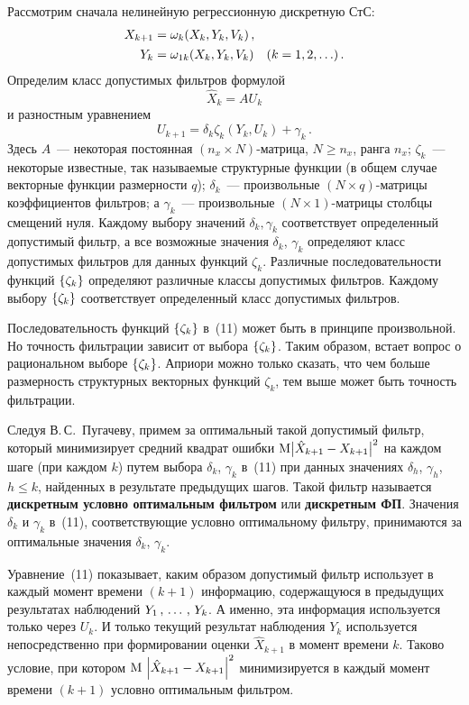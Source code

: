 \begin{multicols}{2}
 Рассмотрим сначала нелинейную регрессионную дискретную СтС:
    \begin{align}
    X_{k+1} &= \omega_k (X_k,Y_k,  V_k)\,,\notag\\[-6pt]
&\\[-8pt]
    Y_k &=\omega_{1k} (X_k, Y_k,  V_k) \quad (k=1,2,\ldots)\,.\notag
\end{align}
 Определим класс
допустимых фильтров формулой
\begin{equation}
\hat X_k = AU_k
\end{equation}
 и разностным уравнением
 \begin{equation}
U_{k+1} = \delta_k\zeta_k (Y_k, U_k) +\gamma_k\,.
\end{equation}
Здесь $A$~--- некоторая постоянная  $(n_x\times N)$-матрица, $N\ge
n_x$, ранга  $n_x$; $\zeta_k$~--- некоторые известные, так
называемые структурные функции (в общем случае векторные
функции размерности $q$); $\delta_k$~--- произвольные  $(N\times
q)$-матрицы коэффициентов фильтров; а  $\gamma_k$~--- произвольные
$(N\times 1)$-матрицы столбцы смещений нуля. Каждому выбору
значений  $\delta_k, \gamma_k$ соответствует определенный
допустимый фильтр, а все возможные значения $\delta_k$, $\gamma_k$
определяют класс допустимых фильтров для данных функций $\zeta_k$.
Различные последовательности функций $\left\{ \zeta_k\right\}$ определяют
различные классы допустимых фильтров. Каждому выбору $\left\{
\zeta_k\right\}$ соответствует определенный класс допустимых фильтров.

Последовательность функций $\left\{ \zeta_k\right\}$ в~(11) может быть в
принципе произвольной. Но точность фильтрации зависит от выбора
$\left\{ \zeta_k\right\}$. Таким образом, встает вопрос о рациональном
выборе $\left\{ \zeta_k\right\}$.  Априори можно только сказать, что чем
больше размерность структурных векторных функций $\zeta_k$, тем
выше может быть точность фильтрации.

Следуя В.\,С.~Пугачеву, примем за оптимальный такой допустимый фильтр, который 
минимизирует средний квадрат ошибки  ${\rm M}\bigl\vert \hat X_{k+1} - 
X_{k+1}\bigr\vert^2$ на каж\-дом шаге (при каж\-дом $k$) путем выбора 
$\delta_k$, $\gamma_k$ в~(11) при данных значениях $\delta_h$, $\gamma_h$, 
$h\le k$, найденных в результате предыду\-щих шагов. Такой фильтр называется 
\textbf{дискретным условно оптимальным фильтром} или \textbf{дискретным ФП}. 
Значения $\delta_k$ и $\gamma_k$ в~(11), со\-от\-вет\-ст\-ву\-ющие условно 
оптимальному фильтру, принимаются за оптимальные значения $\delta_k$, 
$\gamma_k$.

Уравнение~(11) показывает, каким образом допустимый фильтр использует в каждый 
момент времени  $(k+1)$ информацию, содержащуюся в предыду\-щих результатах 
наблюдений  $Y_1 \,,\,\ldots\,,\, Y_{k}$. А именно, эта информация используется только через 
$U_k$. И только текущий результат наблюдения  $Y_k$ используется 
непосредственно при формировании оценки  $\hat X_{k+1}$ в момент времени  $k$. 
Таково условие, при котором  ${\rm M}\,\left\vert \hat X_{k+1}- X_{k+1}\right\vert^2$ 
минимизируется в каждый момент времени $(k+1)$ условно оптимальным фильтром.


\end{multicols}
